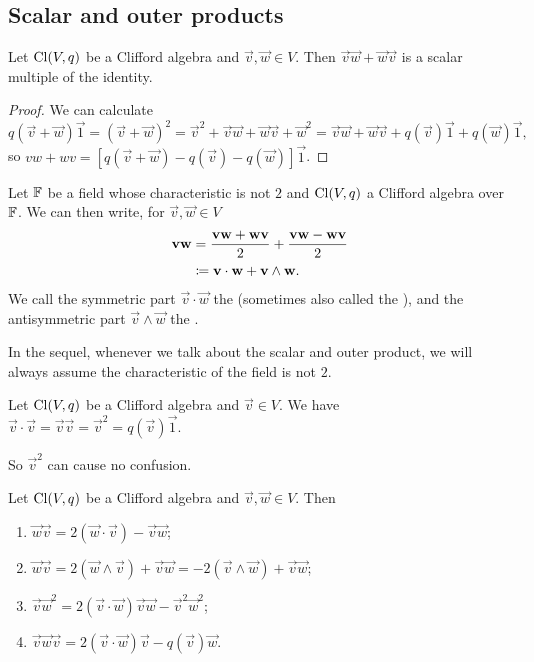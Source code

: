 \subsection{Scalar and outer products}
\begin{lemma}
Let $\operatorname{Cl}(V,q)$ be a Clifford algebra and $\vec{v},\vec{w}\in V$. Then $\vec{v}\vec{w} + \vec{w}\vec{v}$ is a scalar multiple of the identity.
\end{lemma}
\begin{proof}
We can calculate
\[ q(\vec{v}+\vec{w})\vec{1} = (\vec{v}+\vec{w})^2 = \vec{v}^2 + \vec{v}\vec{w} + \vec{w}\vec{v} + \vec{w}^2 = \vec{v}\vec{w} + \vec{w}\vec{v} + q(\vec{v})\vec{1} + q(\vec{w})\vec{1}, \]
so $vw+wv = [q(\vec{v}+\vec{w})-q(\vec{v})-q(\vec{w})]\vec{1}$.
\end{proof}

\begin{definition}
Let $\mathbb{F}$ be a field whose characteristic is not $2$ and $\operatorname{Cl}(V,q)$ a Clifford algebra over $\mathbb{F}$. We can then write, for $\vec{v},\vec{w}\in V$
\begin{align*}
\boldsymbol{\mathrm{v}}\boldsymbol{\mathrm{w}} &= \frac{\boldsymbol{\mathrm{v}}\boldsymbol{\mathrm{w}}+\boldsymbol{\mathrm{w}}\boldsymbol{\mathrm{v}}}{2} + \frac{\boldsymbol{\mathrm{v}}\boldsymbol{\mathrm{w}}-\boldsymbol{\mathrm{w}}\boldsymbol{\mathrm{v}}}{2} \\
&\coloneqq \boldsymbol{\mathrm{v}}\cdot \boldsymbol{\mathrm{w}} + \boldsymbol{\mathrm{v}}\wedge \boldsymbol{\mathrm{w}}.
\end{align*}
We call the symmetric part $\vec{v}\cdot \vec{w}$ the  (sometimes also called the ),
and the antisymmetric part $\vec{v}\wedge \vec{w}$ the .
\end{definition}
In the sequel, whenever we talk about the scalar and outer product, we will always assume the characteristic of the field is not $2$.

\begin{lemma}
Let $\operatorname{Cl}(V,q)$ be a Clifford algebra and $\vec{v}\in V$. We have $\vec{v}\cdot \vec{v} = \vec{v}\vec{v} = \vec{v}^2 = q(\vec{v})\vec{1}$.
\end{lemma}
So $\vec{v}^2$ can cause no confusion.

\begin{lemma} \label{CliffordAlgebraVectorSwap}
Let $\operatorname{Cl}(V,q)$ be a Clifford algebra and $\vec{v},\vec{w}\in V$.
Then
\begin{enumerate}
\item $\vec{w}\vec{v} = 2(\vec{w}\cdot \vec{v}) - \vec{v}\vec{w}$;
\item $\vec{w}\vec{v} = 2(\vec{w}\wedge \vec{v}) + \vec{v}\vec{w} = -2(\vec{v}\wedge \vec{w}) + \vec{v}\vec{w}$;
\item $\vec{v}\vec{w}^2 = 2 (\vec{v}\cdot \vec{w})\vec{v}\vec{w} - \vec{v}^2 \vec{w}^2$;
\item $\vec{v}\vec{w}\vec{v} = 2(\vec{v}\cdot \vec{w})\vec{v} - q(\vec{v})\vec{w}$.
\end{enumerate}
\end{lemma}

